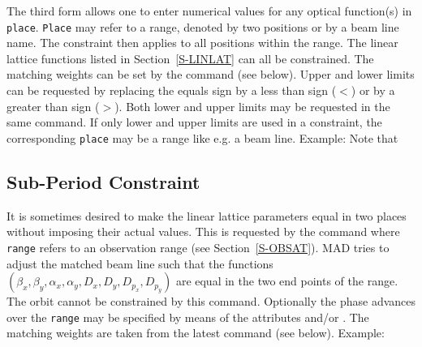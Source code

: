 The third form
allows one to enter numerical values for any optical function(s)
in {\tt place}.
{\tt Place} may refer to a range,
denoted by two positions or by a beam line name.
The constraint then applies to all positions within the range.
The linear lattice functions listed in Section~\ref{S-LINLAT}
can all be constrained.
The matching weights can be set by the  command (see below).
Upper and lower limits can be requested by replacing the equals sign
by a less than sign (\(<\)) or by a greater than sign (\(>\)).
Both lower and upper limits may be requested in the same command.
If only lower and upper limits are used in a constraint,
the corresponding {\tt place} may be a range like e.g. a beam line.
Example:
Note that 
 
\subsection{Sub-Period Constraint}
It is sometimes desired to make the linear lattice parameters
equal in two places without imposing their actual values.
This is requested by the  command
where {\tt range} refers to an observation range
(see Section~\ref{S-OBSAT}).
MAD tries to adjust the matched beam line such that the functions
\((\beta_{x}, \beta_{y}, \alpha_{x}, \alpha_{y},
D_{x}, D_{y}, D_{p_{x}}, D_{p_{y}})\)
are equal in the two end points of the range.
The orbit cannot be constrained by this command.
Optionally the phase advances over the {\tt range}
may be specified by means of the attributes  and/or .
The matching weights are taken from the latest  command
(see below).
Example:
